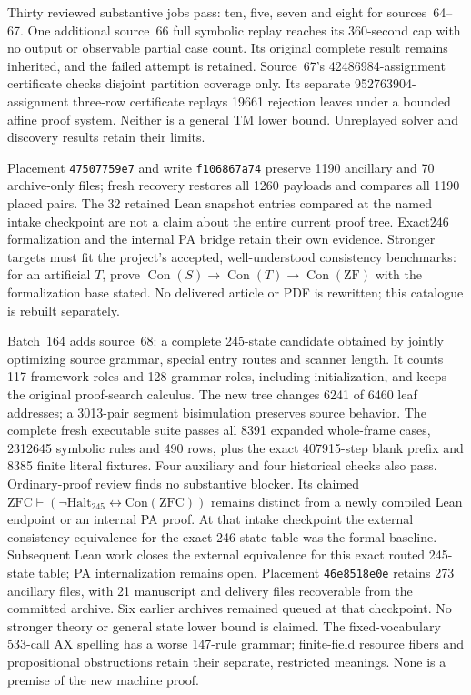 \documentclass[11pt]{article}
\begin{document}
{Thirty reviewed substantive jobs pass: ten, five, seven and eight for
sources~64--67. One additional source~66 full symbolic replay reaches its
360-second cap with no output or observable partial case count. Its original
complete result remains inherited, and the failed attempt is retained.
Source~67's 42486984-assignment certificate checks disjoint partition coverage
only. Its separate 952763904-assignment three-row certificate replays 19661
rejection leaves under a bounded affine proof system. Neither is a general
TM lower bound. Unreplayed solver and discovery results retain their limits.

Placement \texttt{47507759e7} and write \texttt{f106867a74} preserve 1190
ancillary and 70 archive-only files; fresh recovery restores all 1260 payloads
and compares all 1190 placed pairs. The 32 retained Lean snapshot entries
compared at the named intake checkpoint are not a claim about the entire
current proof tree. Exact246 formalization and the internal PA bridge retain
their own evidence. Stronger targets must fit the project's accepted,
well-understood consistency benchmarks: for an artificial $T$, prove
$\operatorname{Con}(S)\to\operatorname{Con}(T)\to\operatorname{Con}(\mathrm{ZF})$ with the formalization base stated.
No delivered article or PDF is rewritten; this catalogue is rebuilt separately.

Batch~164 adds source~68: a complete 245-state candidate obtained by jointly
optimizing source grammar, special entry routes and scanner length. It counts
117 framework roles and 128 grammar roles, including initialization, and keeps
the original proof-search calculus. The new tree changes 6241 of 6460 leaf
addresses; a 3013-pair segment bisimulation preserves source behavior.
The complete fresh executable suite passes all 8391 expanded whole-frame cases,
2312645 symbolic rules and 490 rows, plus the exact 407915-step blank prefix and
8385 finite literal fixtures. Four auxiliary and four historical checks also
pass. Ordinary-proof review finds no substantive blocker. Its claimed
$\mathrm{ZFC}\vdash(\neg\mathrm{Halt}_{245}\leftrightarrow\mathrm{Con}(\mathrm{ZFC}))$
remains distinct from a newly compiled Lean endpoint or an internal PA proof.
At that intake checkpoint the external consistency equivalence for the exact
246-state table was the formal baseline. Subsequent Lean work closes the
external equivalence for this exact routed 245-state table; PA internalization
remains open.
Placement \texttt{46e8518e0e} retains 273 ancillary files, with 21 manuscript and
delivery files recoverable from the committed archive. Six earlier archives
remained queued at that checkpoint. No stronger theory or general state lower bound is
claimed. The fixed-vocabulary 533-call AX spelling has a worse 147-rule grammar;
finite-field resource fibers and propositional obstructions retain their
separate, restricted meanings. None is a premise of the new machine proof.

}
\end{document}
